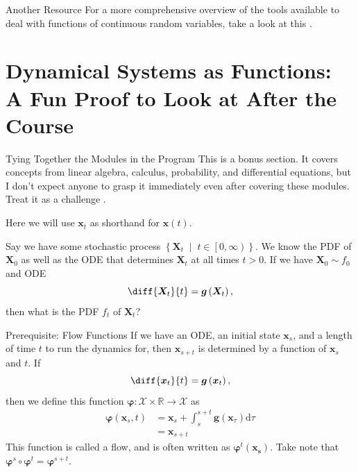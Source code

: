 \documentclass[10pt]{beamer}
\begin{document}
\begin{frame}[fragile]{Another Resource}
For a more comprehensive overview of the tools available to deal with functions of continuous random variables, take a look at this \href{https://en.wikibooks.org/wiki/Probability/Transformation_of_Probability_Densities}{\color{mLightBrown}{Wikibook}}.
\end{frame}

\section{Dynamical Systems as Functions: A Fun Proof to Look at After the Course}

\begin{frame}[fragile]{Tying Together the Modules in the Program}
This is a bonus section. It covers concepts from linear algebra, calculus, probability, and differential equations, but I don't expect anyone to grasp it immediately even after covering these modules. Treat it as a challenge .

Here we will use \(\bm{x}_t\) as shorthand for \(\bm{x}\left(t\right)\).

Say we have some stochastic process \(\left\{\bm{X}_t \;\middle|\; t \in \left[0,\infty\right)\right\}\). We know the PDF of \(\bm{X}_0\) as well as the ODE that determines \(\bm{X}_t\) at all times \(t > 0\). If we have \(\bm{X}_0 \sim f_0\) and ODE
\begin{equation*}
    \diff{\bm{X}_t}{t} = \bm{g}\left(\bm{X}_t\right),
\end{equation*}
then what is the PDF \(f_t\) of \(\bm{X}_t\)?
\end{frame}

\begin{frame}[fragile]{Prerequisite: Flow Functions}
If we have an ODE, an initial state \(\bm{x}_s\), and a length of time \(t\) to run the dynamics for, then \(\bm{x}_{s + t}\) is determined by a function of \(\bm{x}_s\) and \(t\). If
\begin{equation*}
    \diff{\bm{x}_t}{t} = \bm{g}\left(\bm{x}_t\right),
\end{equation*}
 then we define this function \(\bm{\varphi}: \mathcal{X}\times\mathbb{R} \rightarrow \mathcal{X}\) as
 \begin{equation*}
 \begin{aligned}
     \bm{\varphi}\left(\bm{x}_s, t\right) &= \bm{x}_s + \int_s^{s+t} \bm{g}\left(\bm{x}_\tau\right) \mathrm{d}\tau\\
     &= \bm{x}_{s+t}
 \end{aligned}
 \end{equation*}
 This function is called a flow, and is often written as \(\bm{\varphi}^t\left(\bm{x_s}\right)\). Take note that \(\bm{\varphi}^s \circ \bm{\varphi}^t = \bm{\varphi}^{s+t}\).
\end{frame}
\end{document}
